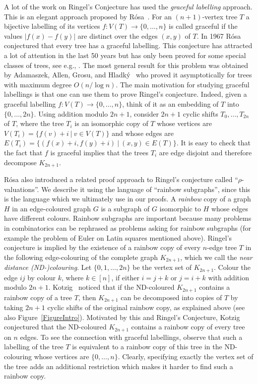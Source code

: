 \documentclass{article}
\theoremstyle{definition}
\begin{document}
A lot of the work on Ringel's Conjecture has used the \emph{graceful labelling} approach.
This is an elegant approach proposed by R\'osa~\cite{rosa1966certain}. For an $(n+1)$-vertex tree $T$ a bijective labelling of its vertices $f: V(T) \rightarrow \{0, \dots, n\}$ is called graceful
if  the values $|f(x)-f(y)|$ are distinct over the edges $(x,y)$ of $T$.
In 1967 R\'osa conjectured that every tree has a graceful labelling. This conjecture has attracted a lot of attention in the last 50 years but has only been proved for some special classes of trees, see e.g., \cite{gallian2009dynamic}.
The most general result for this problem  was obtained by Adamaszek, Allen, Grosu, and Hladk{\'y}~\cite{adamaszek2016almost} who proved it asymptotically for trees with maximum degree $O(n/\log n)$.
The main motivation for studying graceful labellings is that one can use them to prove Ringel's conjecture. Indeed,
given a graceful labelling $f: V(T) \rightarrow \{0, \dots, n\}$, think of it as an embedding  of $T$ into $\{0, \dots, 2n\}$. Using addition modulo $2n+1$, consider $2n+1$ cyclic shifts $T_0, \ldots, T_{2n}$ of $T$, where the tree $T_i$ is an isomorphic copy of $T$ whose vertices are
$V(T_i)=\{f(v)+i~|~ v \in V(T)\}$ and whose edges are $E(T_i)=\{(f(x)+i,f(y)+i)~|~(x,y)\in E(T)\}$. It is easy to check that the fact that $f$ is graceful implies that the trees $T_i$ are edge disjoint and therefore
decompose $K_{2n+1}$.

R\'osa also introduced a related proof approach to Ringel's conjecture called ``$\rho$-valuations''. We describe it using the language of ``rainbow subgraphs'', since this is the language which we ultimately use in our proofs.
A \emph{rainbow} copy of a graph $H$ in an edge-coloured graph $G$ is a subgraph of $G$ isomorphic to $H$ whose edges have different colours. Rainbow subgraphs are important because many problems in combinatorics can be rephrased as problems asking for rainbow subgraphs  (for example the problem of Euler on Latin squares mentioned above).
Ringel's conjecture is implied by the existence of a rainbow copy of every $n$-edge tree $T$  in the following edge-colouring of the complete graph $K_{2n+1}$, which we call the \emph{near distance (ND-)colouring}.
Let $\{0,1,\dots,2n\}$ be the vertex set of $K_{2n+1}$. Colour the edge $ij$ by colour $k$, where $k\in [n]$, if either $i=j+k$ or $j=i+k$ with addition modulo $2n+1$.
Kotzig~\cite{rosa1966certain} noticed that if the ND-coloured $K_{2n+1}$ contains a rainbow copy of a tree $T$, then $K_{2n+1}$ can be decomposed into copies of $T$ by taking $2n+1$ cyclic shifts of the original rainbow copy, as explained above (see also Figure~\ref{FigureIntro}). Motivated by this and Ringel's Conjecture, Kotzig conjectured that the ND-coloured $K_{2n+1}$ contains a rainbow copy of every  tree on $n$ edges.
To see the connection with graceful labellings, observe that such a labelling of the tree $T$ is equivalent to a rainbow copy of this tree in the ND-colouring whose vertices are $\{0, \dots, n\}$. Clearly, specifying exactly the vertex set of the tree adds an additional restriction which makes it harder to find such a rainbow copy.
\end{document}
